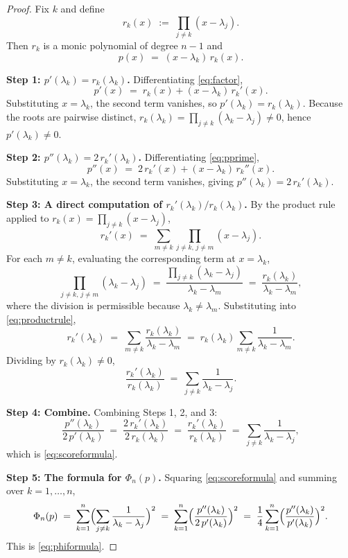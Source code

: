 \documentclass[12pt]{article}
\theoremstyle{definition}
\begin{document}
\begin{proof}
Fix $k$ and define
\[
r_k(x) \;:=\; \prod_{j\neq k}(x-\lambda_j).
\]
Then $r_k$ is a monic polynomial of degree $n-1$ and
\begin{equation}\label{eq:factor}
p(x) \;=\; (x-\lambda_k)\,r_k(x).
\end{equation}

\textbf{Step 1: $p'(\lambda_k)=r_k(\lambda_k)$.}
Differentiating \eqref{eq:factor},
\begin{equation}\label{eq:pprime}
p'(x) \;=\; r_k(x) + (x-\lambda_k)\,r_k'(x).
\end{equation}
Substituting $x=\lambda_k$, the second term vanishes, so $p'(\lambda_k)=r_k(\lambda_k)$. Because the roots are pairwise distinct, $r_k(\lambda_k)=\prod_{j\neq k}(\lambda_k-\lambda_j)\neq 0$, hence $p'(\lambda_k)\neq 0$.

\textbf{Step 2: $p''(\lambda_k)=2\,r_k'(\lambda_k)$.}
Differentiating \eqref{eq:pprime},
\begin{equation}\label{eq:psecond}
p''(x) \;=\; 2\,r_k'(x) + (x-\lambda_k)\,r_k''(x).
\end{equation}
Substituting $x=\lambda_k$, the second term vanishes, giving $p''(\lambda_k)=2\,r_k'(\lambda_k)$.

\textbf{Step 3: A direct computation of $r_k'(\lambda_k)/r_k(\lambda_k)$.}
By the product rule applied to $r_k(x)=\prod_{j\neq k}(x-\lambda_j)$,
\begin{equation}\label{eq:productrule}
r_k'(x) \;=\; \sum_{m\neq k}\prod_{j\neq k,\,j\neq m}(x-\lambda_j).
\end{equation}
For each $m\neq k$, evaluating the corresponding term at $x=\lambda_k$,
\[
\prod_{j\neq k,\,j\neq m}(\lambda_k-\lambda_j) \;=\; \frac{\prod_{j\neq k}(\lambda_k-\lambda_j)}{\lambda_k-\lambda_m} \;=\; \frac{r_k(\lambda_k)}{\lambda_k-\lambda_m},
\]
where the division is permissible because $\lambda_k\neq\lambda_m$. Substituting into \eqref{eq:productrule},
\begin{equation}\label{eq:logd2}
r_k'(\lambda_k) \;=\; \sum_{m\neq k}\frac{r_k(\lambda_k)}{\lambda_k-\lambda_m} \;=\; r_k(\lambda_k)\sum_{m\neq k}\frac{1}{\lambda_k-\lambda_m}.
\end{equation}
Dividing by $r_k(\lambda_k)\neq 0$,
\begin{equation}\label{eq:logderiv}
\frac{r_k'(\lambda_k)}{r_k(\lambda_k)} \;=\; \sum_{j\neq k}\frac{1}{\lambda_k-\lambda_j}.
\end{equation}

\textbf{Step 4: Combine.}
Combining Steps 1, 2, and 3:
\[
\frac{p''(\lambda_k)}{2\,p'(\lambda_k)}
\;=\; \frac{2\,r_k'(\lambda_k)}{2\,r_k(\lambda_k)}
\;=\; \frac{r_k'(\lambda_k)}{r_k(\lambda_k)}
\;=\; \sum_{j\neq k}\frac{1}{\lambda_k-\lambda_j},
\]
which is \eqref{eq:scoreformula}.

\textbf{Step 5: The formula for $\Phi_n(p)$.}
Squaring \eqref{eq:scoreformula} and summing over $k=1,\dots,n$,
\[
\Phi_n(p) \;=\; \sum_{k=1}^n\Bigl(\sum_{j\neq k}\frac{1}{\lambda_k-\lambda_j}\Bigr)^2
\;=\; \sum_{k=1}^n\Bigl(\frac{p''(\lambda_k)}{2\,p'(\lambda_k)}\Bigr)^2
\;=\; \frac{1}{4}\sum_{k=1}^n\Bigl(\frac{p''(\lambda_k)}{p'(\lambda_k)}\Bigr)^2.
\]
This is \eqref{eq:phiformula}.
\end{proof}
\end{document}
